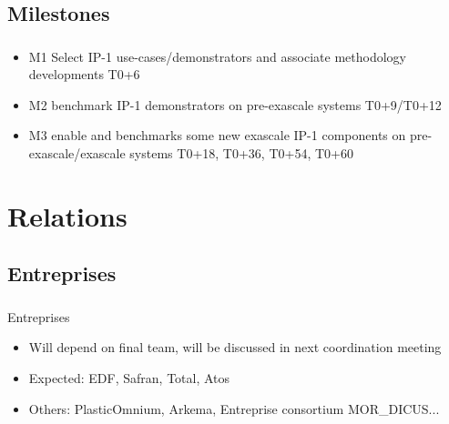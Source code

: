 \subsection{Milestones}

\begin{frame}
  \frametitle{\insertsectionhead}
  \framesubtitle{\insertsubsectionhead}

  \begin{itemize}
    \item   M1 Select IP-1 use-cases/demonstrators and associate methodology developments T0+6
    \item M2 benchmark IP-1 demonstrators on pre-exascale systems T0+9/T0+12
    \item M3 enable and benchmarks some new exascale  IP-1 components on pre-exascale/exascale systems T0+18, T0+36, T0+54, T0+60
\end{itemize}


\end{frame}




\section{Relations}
\subsection{Entreprises}
\begin{frame}
  \frametitle{\insertsectionhead}
  \framesubtitle{\insertsubsectionhead}
  \begin{alertblock}{Entreprises}
    \begin{itemize}
      \item Will depend on final team, will be discussed in next coordination meeting
      \item Expected: EDF, Safran, Total, Atos
      \item Others: PlasticOmnium, Arkema, Entreprise consortium MOR\_DICUS...
    \end{itemize}
  \end{alertblock}
\end{frame}

